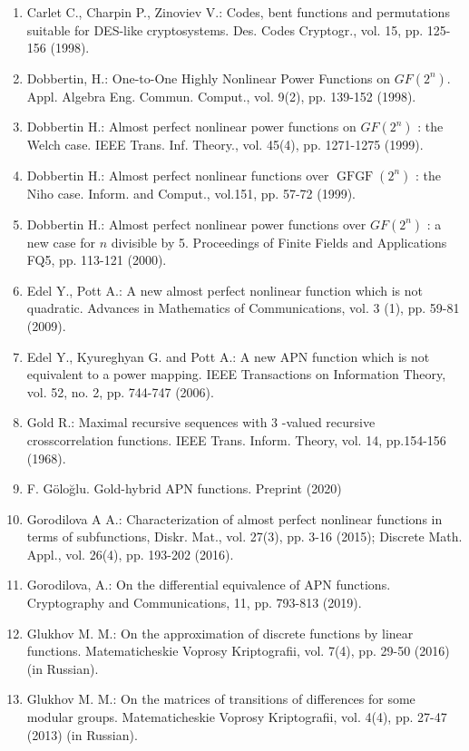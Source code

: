 \documentclass[10pt]{article}
\begin{document}
\begin{enumerate}
  \item Carlet C., Charpin P., Zinoviev V.: Codes, bent functions and permutations suitable for DES-like cryptosystems. Des. Codes Cryptogr., vol. 15, pp. 125-156 (1998).
  \item Dobbertin, H.: One-to-One Highly Nonlinear Power Functions on $G F\left(2^{n}\right)$. Appl. Algebra Eng. Commun. Comput., vol. 9(2), pp. 139-152 (1998).
  \item Dobbertin H.: Almost perfect nonlinear power functions on $G F\left(2^{n}\right)$ : the Welch case. IEEE Trans. Inf. Theory., vol. 45(4), pp. 1271-1275 (1999).
  \item Dobbertin H.: Almost perfect nonlinear functions over $\operatorname{GFGF}\left(2^{n}\right)$ : the Niho case. Inform. and Comput., vol.151, pp. 57-72 (1999).
  \item Dobbertin H.: Almost perfect nonlinear power functions over $G F\left(2^{n}\right)$ : a new case for $n$ divisible by 5. Proceedings of Finite Fields and Applications FQ5, pp. 113-121 (2000).
  \item Edel Y., Pott A.: A new almost perfect nonlinear function which is not quadratic. Advances in Mathematics of Communications, vol. 3 (1), pp. 59-81 (2009).
  \item Edel Y., Kyureghyan G. and Pott A.: A new APN function which is not equivalent to a power mapping. IEEE Transactions on Information Theory, vol. 52, no. 2, pp. 744-747 (2006).
  \item Gold R.: Maximal recursive sequences with 3 -valued recursive crosscorrelation functions. IEEE Trans. Inform. Theory, vol. 14, pp.154-156 (1968).
  \item F. Göloğlu. Gold-hybrid APN functions. Preprint (2020)
  \item Gorodilova A A.: Characterization of almost perfect nonlinear functions in terms of subfunctions, Diskr. Mat., vol. 27(3), pp. 3-16 (2015); Discrete Math. Appl., vol. 26(4), pp. 193-202 (2016).
  \item Gorodilova, A.: On the differential equivalence of APN functions. Cryptography and Communications, 11, pp. 793-813 (2019).
  \item Glukhov M. M.: On the approximation of discrete functions by linear functions. Matematicheskie Voprosy Kriptografii, vol. 7(4), pp. 29-50 (2016) (in Russian).
  \item Glukhov M. M.: On the matrices of transitions of differences for some modular groups. Matematicheskie Voprosy Kriptografii, vol. 4(4), pp. 27-47 (2013) (in Russian).

\end{enumerate}
\end{document}
